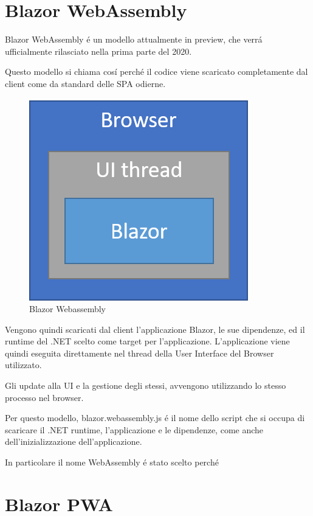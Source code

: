 \section{Blazor WebAssembly}\label{sez:bclient}
Blazor WebAssembly \'e un modello attualmente in preview, che verr\'a ufficialmente rilasciato nella prima parte del 2020.

Questo modello si chiama cos\'i perch\'e il codice viene scaricato completamente dal client come da standard delle SPA odierne.

\begin{figure}[H]
	\centerline{\includegraphics[scale=0.6]{figure/blazor-webassembly.png}}
	\caption{Blazor Webassembly}
	\label{fig:BlazorWebassembly}
\end{figure}

Vengono quindi scaricati dal client l'applicazione Blazor, le sue dipendenze, ed il runtime del .NET scelto come target per l'applicazione.
L'applicazione viene quindi eseguita direttamente nel thread della User Interface del Browser utilizzato.

Gli update alla UI e la gestione degli stessi, avvengono utilizzando lo stesso processo nel browser.

Per questo modello, blazor.webassembly.js \'e il nome dello script che si occupa di scaricare il .NET runtime, l'applicazione e le dipendenze, come anche dell'inizializzazione dell'applicazione.

In particolare il nome WebAssembly \'e stato scelto perch\'e 

\section{Blazor PWA}\label{sez:bpwa}


